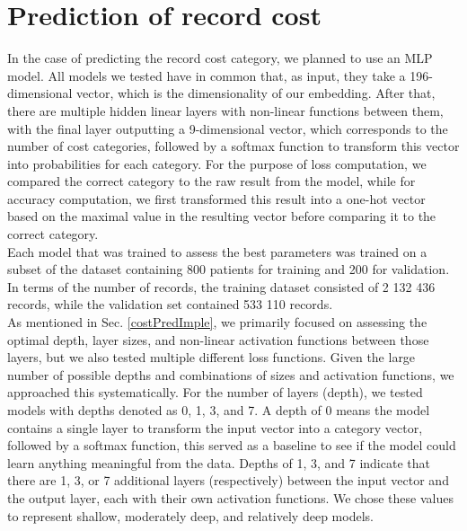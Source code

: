 
\section{Prediction of record cost}
\label{costPredRes}

In the case of predicting the record cost category, we planned to use an MLP model. All models we tested have in common that, as input, they take a 196-dimensional vector, which is the dimensionality of our embedding. After that, there are multiple hidden linear layers with non-linear functions between them, with the final layer outputting a 9-dimensional vector, which corresponds to the number of cost categories, followed by a softmax function to transform this vector into probabilities for each category. For the purpose of loss computation, we compared the correct category to the raw result from the model, while for accuracy computation, we first transformed this result into a one-hot vector based on the maximal value in the resulting vector before comparing it to the correct category.
\\

Each model that was trained to assess the best parameters was trained on a subset of the dataset containing 800 patients for training and 200 for validation. In terms of the number of records, the training dataset consisted of 2 132 436 records, while the validation set contained 533 110 records.
\\

As mentioned in Sec. \ref{costPredImple}, we primarily focused on assessing the optimal depth, layer sizes, and non-linear activation functions between those layers, but we also tested multiple different loss functions. Given the large number of possible depths and combinations of sizes and activation functions, we approached this systematically. For the number of layers (depth), we tested models with depths denoted as 0, 1, 3, and 7. A depth of 0 means the model contains a single layer to transform the input vector into a category vector, followed by a softmax function, this served as a baseline to see if the model could learn anything meaningful from the data. Depths of 1, 3, and 7 indicate that there are 1, 3, or 7 additional layers (respectively) between the input vector and the output layer, each with their own activation functions. We chose these values to represent shallow, moderately deep, and relatively deep models.
\\


